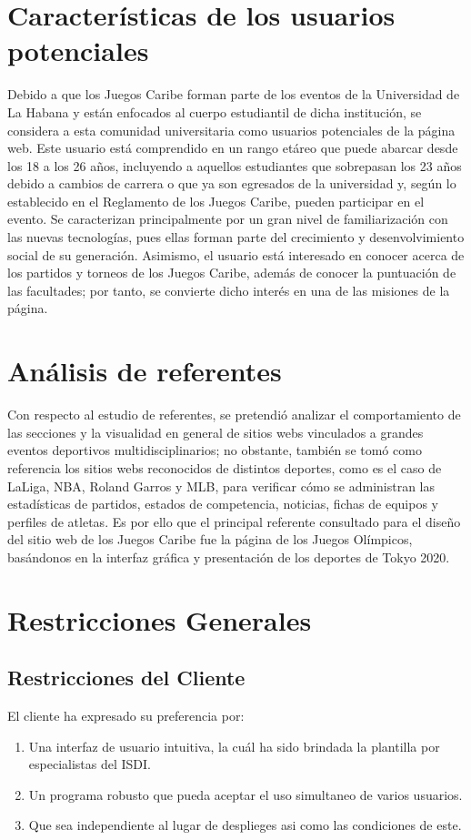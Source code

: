 \documentclass{article} %
\begin{document}
\section{Características de los usuarios potenciales}
Debido a que los Juegos Caribe forman parte de los eventos 
de la Universidad de La Habana y están enfocados al cuerpo 
estudiantil de dicha institución, se considera a esta comunidad 
universitaria como usuarios potenciales de la página web.
Este usuario está comprendido en un rango etáreo que puede 
abarcar desde los 18 a los 26 años, incluyendo a aquellos estudiantes que sobrepasan los 23 años debido a cambios de 
carrera o que ya son egresados de la universidad y, según lo 
establecido en el Reglamento de los Juegos Caribe, pueden 
participar en el evento. 
Se caracterizan principalmente por un gran nivel de familiarización con las nuevas tecnologías, pues ellas forman parte 
del crecimiento y desenvolvimiento social de su generación. 
Asimismo, el usuario está interesado en conocer acerca de los 
partidos y torneos de los Juegos Caribe, además de conocer 
la puntuación de las facultades; por tanto, se convierte dicho 
interés en una de las misiones de la página.

\section{Análisis de referentes}
Con respecto al estudio de referentes, se pretendió analizar 
el comportamiento de las secciones y la visualidad en general 
de sitios webs vinculados a grandes eventos deportivos multidisciplinarios; no obstante, también se tomó como referencia 
los sitios webs reconocidos de distintos deportes, como es 
el caso de LaLiga, NBA, Roland Garros y MLB, para verificar 
cómo se administran las estadísticas de partidos, estados de 
competencia, noticias, fichas de equipos y perfiles de atletas.
Es por ello que el principal referente consultado para el diseño 
del sitio web de los Juegos Caribe fue la página de los Juegos 
Olímpicos, basándonos en la interfaz gráfica y presentación 
de los deportes de Tokyo 2020.

\section{Restricciones Generales}
\subsection{Restricciones del Cliente}
 El cliente ha expresado su preferencia por:
\begin{enumerate}
    \item Una interfaz de usuario intuitiva, la cuál ha sido brindada la plantilla por especialistas del ISDI.
    \item Un programa robusto que pueda aceptar el uso simultaneo de varios usuarios.
    \item Que sea independiente al lugar de desplieges asi como las condiciones de este.
\end{enumerate}
\end{document}
